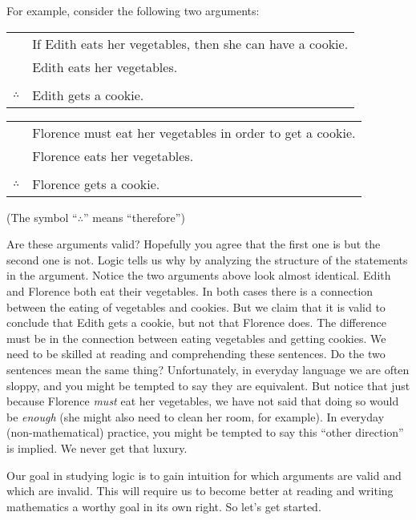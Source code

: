 \documentclass[10pt,]{book}
\theoremstyle{plain}
\theoremstyle{definition}
\theoremstyle{definition}
\theoremstyle{definition}
\numberwithin{equation}{chapter}
\newcommand{\hrulethin}  {\noalign{\hrule height 0.04em}}
\begin{document}
For example, consider the following two arguments:
%
\leavevmode%
\begin{table}
\centering
\begin{tabular}{ll}
&If Edith eats her vegetables, then she can have a cookie.\tabularnewline[0pt]
&Edith eats her vegetables.\tabularnewline[0pt]
&\tabularnewline\hrulethin
\(\therefore\)&Edith gets a cookie.
\end{tabular}
\end{table}
\leavevmode%
\begin{table}
\centering
\begin{tabular}{ll}
&Florence must eat her vegetables in order to get a cookie.\tabularnewline[0pt]
&Florence eats her vegetables.\tabularnewline[0pt]
&\tabularnewline\hrulethin
\(\therefore\)&Florence gets a cookie.
\end{tabular}
\end{table}
\par

(The symbol ``\(\therefore\)\index{\(\therefore\)}'' means ``therefore'')
%
\par

Are these arguments valid? Hopefully you agree that the first one is but the second one is not. Logic tells us why by analyzing the structure of the statements in the argument. Notice the two arguments above look almost identical. Edith and Florence both eat their vegetables. In both cases there is a connection between the eating of vegetables and cookies. But we claim that it is valid to conclude that Edith gets a cookie, but not that Florence does. The difference must be in the connection between eating vegetables and getting cookies. We need to be skilled at reading and comprehending these sentences. Do the two sentences mean the same thing? Unfortunately, in everyday language we are often sloppy, and you might be tempted to say they are equivalent. But notice that just because Florence \emph{must} eat her vegetables, we have not said that doing so would be \emph{enough} (she might also need to clean her room, for example). In everyday (non-mathematical) practice, you might be tempted to
say this ``other direction'' is implied. We never get that luxury.
%
\par

Our goal in studying logic is to gain intuition for which arguments are valid and which are invalid. This will require us to become better at reading and writing mathematics \textendash{} a worthy goal in its own right. So let's get started.
%
\typeout{************************************************}
\typeout{************************************************}
\end{document}
